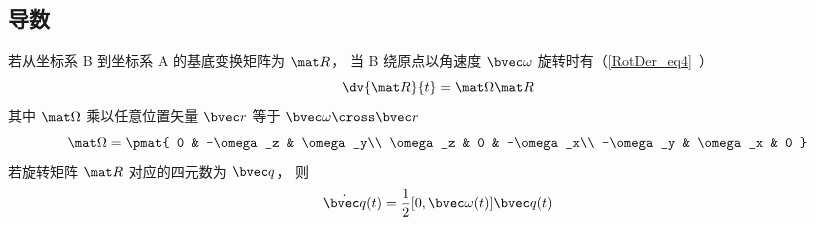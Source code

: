 \subsection{导数}
若从坐标系 B 到坐标系 A 的基底变换矩阵为 $\mat R$， 当 B 绕原点以角速度 $\bvec \omega$ 旋转时有（\autoref{RotDer_eq4}~）
\begin{equation}
\dv{\mat R}{t} = \mat \Omega \mat R
\end{equation}
其中 $\mat\Omega$ 乘以任意位置矢量 $\bvec r$ 等于 $\bvec \omega \cross \bvec r$
\begin{equation}
\mat \Omega = \pmat{
0 & -\omega_z & \omega_y\\
\omega_z & 0 & -\omega_x\\
-\omega_y & \omega_x & 0
}\end{equation}
若旋转矩阵 $\mat R$ 对应的四元数为 $\bvec q$， 则
\begin{equation}\label{QuatN_eq1}
\dot {\bvec q}(t) = \frac12 [0, \bvec \omega(t)] \bvec q(t)
\end{equation}

